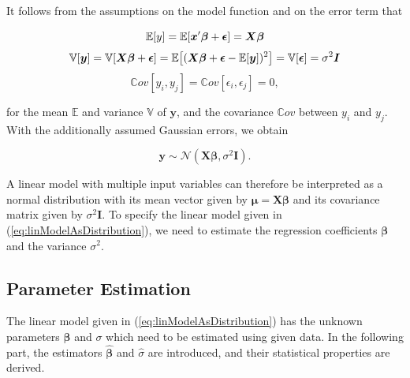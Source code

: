 \documentclass[10pt,a4paper]{article}
\begin{document}
It follows from the assumptions on the model function and on the error term that

\begin{equation}
	\mathbb E[y] = \mathbb E [\boldsymbol{x}'\boldsymbol{\beta} + \boldsymbol{\epsilon}] = \boldsymbol{X} \boldsymbol{\beta} \\
\end{equation}
\begin{equation}
	\mathbb V[\boldsymbol{y}] = \mathbb V[\boldsymbol{X} \boldsymbol{\beta} + \boldsymbol{\epsilon}] = \mathbb{E}\big[(\boldsymbol{X} \boldsymbol{\beta} + \boldsymbol{\epsilon} - \mathbb{E}[\boldsymbol{y}])^2\big] = \mathbb V[\boldsymbol{\epsilon}] = \sigma^2 \boldsymbol{I} \\
\end{equation}
\begin{equation}
	\mathbb Cov[y_i, y_j] = \mathbb Cov[\epsilon_i, \epsilon_j] = 0, 
\end{equation}
	
for the mean $\mathbb{E}$ and variance $\mathbb{V}$ of $\boldsymbol{y}$, and the covariance $\mathbb Cov$ between $y_i$ and $y_j$. With the additionally assumed Gaussian errors, we obtain

\begin{equation} \label{eq:linModelAsDistribution}
	\boldsymbol{y} \sim \mathcal N(\boldsymbol{X} \boldsymbol{\beta}, \sigma^2 \boldsymbol{I}).
\end{equation}

A linear model with multiple input variables can therefore be interpreted as a normal distribution with its mean vector given by $\boldsymbol{\mu} = \boldsymbol{X} \boldsymbol{\beta}$ and its covariance matrix given by $\sigma^2 \boldsymbol{I}$. To specify the linear model given in (\ref{eq:linModelAsDistribution}), we need to estimate the regression coefficients $\boldsymbol{\beta}$ and the variance $\sigma^2$.

\subsection{Parameter Estimation}

The linear model given in (\ref{eq:linModelAsDistribution}) has the unknown parameters $\boldsymbol{\beta}$ and $\sigma$ which need to be estimated using given data. In the following part, the estimators $\boldsymbol{\hat{\beta}}$ and $\hat \sigma$ are introduced, and their statistical properties are derived. 
\end{document}
